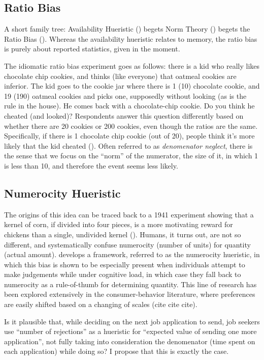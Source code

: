 \documentclass[a4paper,12pt]{article}
\begin{document}
\subsection{Ratio Bias}

A short family tree: Availability Hueristic (\cite{tversky1973}) begets Norm Theory (\cite{kahneman1986}) begets the Ratio Bias (\cite{miller1989}). Whereas the availability hueristic relates to memory, the ratio bias is purely about reported statistics, given in the moment.

The idiomatic ratio bias experiment goes as follows: there is a kid who really likes chocolate chip cookies, and thinks (like everyone) that oatmeal cookies are inferior. The kid goes to the cookie jar where there is 1 (10) chocolate cookie, and 19 (190) oatmeal cookies and picks one, supposedly without looking (as is the rule in the house). He comes back with a chocolate-chip cookie. Do you think he cheated (and looked)? Respondents answer this question differently based on whether there are 20 cookies or 200 cookies, even though the ratios are the same. Specifically, if there is 1 chocolate chip cookie (out of 20), people think it's more likely that the kid cheated (\cite{miller1989}). Often referred to as \textit{denomenator neglect}, there is the sense that we focus on the ``norm'' of the numerator, the size of it, in which 1 is less than 10, and therefore the event seems less likely.

\subsection{Numerocity Hueristic}

The origins of this idea can be traced back to a 1941 experiment showing that a kernel of corn, if divided into four pieces, is a more motivating reward for chickens than a single, undivided kernel (\cite{wolfe1941}). Humans, it turns out, are not so different, and systematically confuse numerocity (number of units) for quantity (actual amount). \cite{pelham1994} develops a framework, referred to as the numerocity hueristic, in which this bias is shown to be especially present when individuals attempt to make judgements while under cognitive load, in which case they fall back to numerocity as a rule-of-thumb for determining quantity. This line of research has been explored extensively in the consumer-behavior literature, where preferences are easily shifted based on a changing of scales (cite cite cite).

Is it plausible that, while deciding on the next job application to send, job seekers use ``number of rejections'' as a hueristic for ``expected value of sending one more application'', not fully taking into consideration the denomenator (time spent on each application) while doing so? I propose that this is exactly the case.
\end{document}
